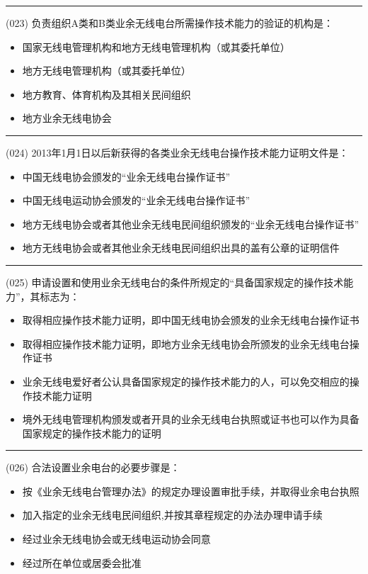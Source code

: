 \documentclass[twocolumn]{ctexart}  %
\begin{document}
\noindent\rule{0.5\textwidth}{1pt}
\heiti (023) 负责组织A类和B类业余无线电台所需操作技术能力的验证的机构是： \songti {\color{gray} [LK0020] }
\begin{itemize}
	\item  国家无线电管理机构和地方无线电管理机构（或其委托单位）
	\item  地方无线电管理机构（或其委托单位）
	\item  地方教育、体育机构及其相关民间组织
	\item  地方业余无线电协会
\end{itemize}


\noindent\rule{0.5\textwidth}{1pt}
\heiti (024) 2013年1月1日以后新获得的各类业余无线电台操作技术能力证明文件是： \songti {\color{gray} [LK0022] }
\begin{itemize}
	\item  中国无线电协会颁发的“业余无线电台操作证书”
	\item  中国无线电运动协会颁发的“业余无线电台操作证书”
	\item  地方无线电协会或者其他业余无线电民间组织颁发的“业余无线电台操作证书”
	\item  地方无线电协会或者其他业余无线电民间组织出具的盖有公章的证明信件
\end{itemize}


\noindent\rule{0.5\textwidth}{1pt}
\heiti (025) 申请设置和使用业余无线电台的条件所规定的“具备国家规定的操作技术能力”，其标志为： \songti {\color{gray} [LK0043] }
\begin{itemize}
	\item  取得相应操作技术能力证明，即中国无线电协会颁发的业余无线电台操作证书
	\item  取得相应操作技术能力证明，即地方业余无线电协会所颁发的业余无线电台操作证书
	\item  业余无线电爱好者公认具备国家规定的操作技术能力的人，可以免交相应的操作技术能力证明
	\item  境外无线电管理机构颁发或者开具的业余无线电台执照或证书也可以作为具备国家规定的操作技术能力的证明
\end{itemize}


\noindent\rule{0.5\textwidth}{1pt}
\heiti (026) 合法设置业余电台的必要步骤是： \songti {\color{gray} [LK0006] }
\begin{itemize}
	\item  按《业余无线电台管理办法》的规定办理设置审批手续，并取得业余电台执照
	\item  加入指定的业余无线电民间组织,并按其章程规定的办法办理申请手续
	\item  经过业余无线电协会或无线电运动协会同意
	\item  经过所在单位或居委会批准
\end{itemize}
\end{document}
